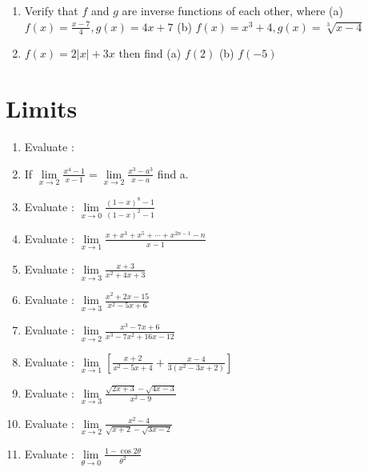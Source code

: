 \documentclass[17pt]{extarticle}
\begin{document}
\begin{multicols}{2}
\begin{enumerate}
\item Verify that $ f $  and  $ g $ are inverse functions of each other, where (a) $ f(x) = \frac { x - 7 }{4}, g(x) = 4x + 7 $ (b) $ f(x) = x^3 + 4, g(x) = \sqrt[3]{x - 4 } $

\item $ f(x) = 2 \left| x \right| + 3x $ then find (a) $ f(2)$ (b) $ f(-5) $

\end{enumerate} 

\section{Limits}
\noindent
\begin{enumerate}
\item Evaluate : 
 
\item If $ \lim\limits_{x \to 2} \frac{ x^4 - 1}{ x - 1} = \lim\limits_{x \to 2} \frac{ x^3 - a^3}{x-a} $ find a.

\item Evaluate : $ \lim\limits_{x \to 0} \frac{ (1- x)^8 - 1}{(1- x)^2 - 1} $ 

 \item Evaluate : $ \lim\limits_{ x \to 1 } \frac{ x + x^3 + x^5 +\cdots +x^{2n - 1} - n }{x-1} $
 
 \item Evaluate : $ \lim\limits_{x \to 3} \frac{ x + 3}{ x^2 +4x + 3 } $
 
\item Evaluate : $ \lim\limits_{x \to 3} \frac{ x^2 + 2x - 15}{ x^2 - 5x + 6 } $

\item Evaluate : $ \lim\limits_{x \to 2} \frac{ x^3 - 7x + 6}{ x^3 - 7x^2 + 16x - 12   } $

\item Evaluate : $ \lim\limits_{ x \to 1 } \left[ \frac{ x + 2 }{x^2-5x + 4} + \frac{ x - 4 }{3(x^2-3x+2)} \right] $

\item Evaluate : $ \lim\limits_{x \to 3} \frac{ \sqrt{ 2x + 3 } - \sqrt{ 4x - 3 } }{ x^2 - 9 } $

\item Evaluate : $ \lim\limits_{x \to 2} \frac{ x^2 - 4 }{ \sqrt{ x + 2 } - \sqrt{ 3x - 2 }  } $

 \item Evaluate : $ \lim\limits_{ \theta \to 0} \frac{ 1 -  \cos 2\theta }{ \theta ^2  } $
 

\end{enumerate}
\end{multicols}
\end{document}

